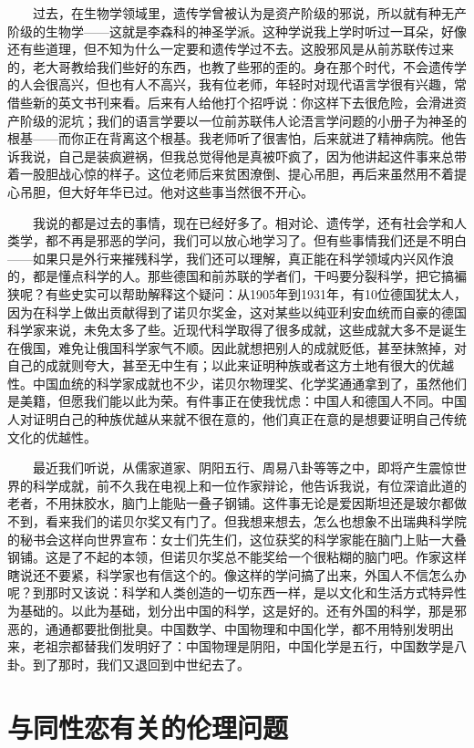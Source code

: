 　　过去，在生物学领域里，遗传学曾被认为是资产阶级的邪说，所以就有种无产阶级的生物学——这就是李森科的神圣学派。这种学说我上学时听过一耳朵，好像还有些道理，但不知为什么一定要和遗传学过不去。这股邪风是从前苏联传过来的，老大哥教给我们些好的东西，也教了些邪的歪的。身在那个时代，不会遗传学的人会很高兴，但也有人不高兴，我有位老师，年轻时对现代语言学很有兴趣，常借些新的英文书刊来看。后来有人给他打个招呼说：你这样下去很危险，会滑进资产阶级的泥坑；我们的语言学要以一位前苏联伟人论浯言学问题的小册子为神圣的根基——而你正在背离这个根基。我老师听了很害怕，后来就进了精神病院。他告诉我说，自己是装疯避祸，但我总觉得他是真被吓疯了，因为他讲起这件事来总带着一股胆战心惊的样子。这位老师后来贫困潦倒、提心吊胆，再后来虽然用不着提心吊胆，但大好年华已过。他对这些事当然很不开心。 

　　我说的都是过去的事情，现在已经好多了。相对论、遗传学，还有社会学和人类学，都不再是邪恶的学问，我们可以放心地学习了。但有些事情我们还是不明白 ——如果只是外行来摧残科学，我们还可以理解，真正能在科学领域内兴风作浪的，都是懂点科学的人。那些德国和前苏联的学者们，干吗要分裂科学，把它搞褊狭呢？有些史实可以帮助解释这个疑问：从1905年到1931年，有10位德国犹太人，因为在科学上做出贡献得到了诺贝尔奖金，这对某些以纯亚利安血统而自豪的德国科学家来说，未免太多了些。近现代科学取得了很多成就，这些成就大多不是诞生在俄国，难免让俄国科学家气不顺。因此就想把别人的成就贬低，甚至抹煞掉，对自己的成就则夸大，甚至无中生有；以此来证明种族或者这方土地有很大的优越性。中国血统的科学家成就也不少，诺贝尔物理奖、化学奖通通拿到了，虽然他们是美籍，但愿我们能以此为荣。有件事正在使我忧虑：中国人和德国人不同。中国人对证明白己的种族优越从来就不很在意的，他们真正在意的是想要证明自己传统文化的优越性。 

　　最近我们听说，从儒家道家、阴阳五行、周易八卦等等之中，即将产生震惊世界的科学成就，前不久我在电视上和一位作家辩论，他告诉我说，有位深谙此道的老者，不用抹胶水，脑门上能贴一叠子钢铺。这件事无论是爱因斯坦还是玻尔都做不到，看来我们的诺贝尔奖又有门了。但我想来想去，怎么也想象不出瑞典科学院的秘书会这样向世界宣布：女士们先生们，这位获奖的科学家能在脑门上贴一大叠钢铺。这是了不起的本领，但诺贝尔奖总不能奖给一个很粘糊的脑门吧。作家这样瞎说还不要紧，科学家也有信这个的。像这样的学问搞了出来，外国人不信怎么办呢？到那时又该说：科学和人类创造的一切东西一样，是以文化和生活方式特异性为基础的。以此为基础，划分出中国的科学，这是好的。还有外国的科学，那是邪恶的，通通都要批倒批臭。中国数学、中国物理和中国化学，都不用特别发明出来，老祖宗都替我们发明好了：中国物理是阴阳，中国化学是五行，中国数学是八卦。到了那时，我们又退回到中世纪去了。

\chapter{与同性恋有关的伦理问题}

